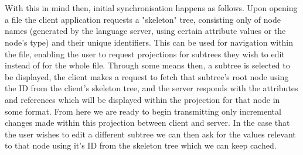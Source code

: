 \documentclass{article}
\begin{document}
\\
\\
With this in mind then, initial synchronisation happens as follows. Upon opening a file the client application requests a "skeleton" tree, consisting only of node names (generated by the language server, using certain attribute values or the node's type) and their unique identifiers. This can be used for navigation within the file, enabling the user to request projections for subtrees they wish to edit instead of for the whole file. Through some means then, a subtree is selected to be displayed, the client makes a request to fetch that subtree's root node using the ID from the client's skeleton tree, and the server responds with the attributes and references which will be displayed within the projection for that node in some format. From here we are ready to begin transmitting only incremental changes made within this projection between client and server. In the case that the user wishes to edit a different subtree we can then ask for the values relevant to that node using it's ID from the skeleton tree which we can keep cached.
\end{document}
